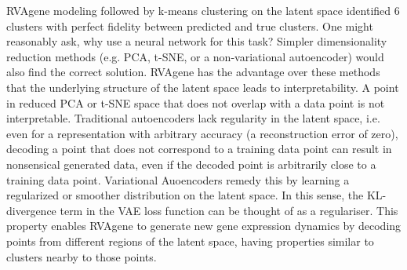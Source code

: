 RVAgene modeling followed by k-means clustering on the latent space identified 6 clusters with perfect fidelity between predicted and true clusters. One might reasonably ask, why use a neural network for this task? Simpler dimensionality reduction methods (e.g. PCA, t-SNE, or a non-variational autoencoder) would also find the correct solution. RVAgene has the advantage over these methods that the underlying structure of the latent space leads to interpretability. A point in reduced PCA or t-SNE space that does not overlap with a data point is not interpretable. Traditional autoencoders lack regularity in the latent space, i.e. even for a representation with arbitrary accuracy (a reconstruction error of zero), decoding a point that does not correspond to a training data point can result in nonsensical generated data, even if the decoded point is arbitrarily close to a training data point. Variational Auoencoders remedy this by learning a regularized or smoother distribution on the latent space. In this sense, the KL-divergence term in the VAE loss function can be thought of as a regulariser. This property enables RVAgene to generate new gene expression dynamics by decoding points from different regions of the latent space, having properties similar to clusters nearby to those points.


